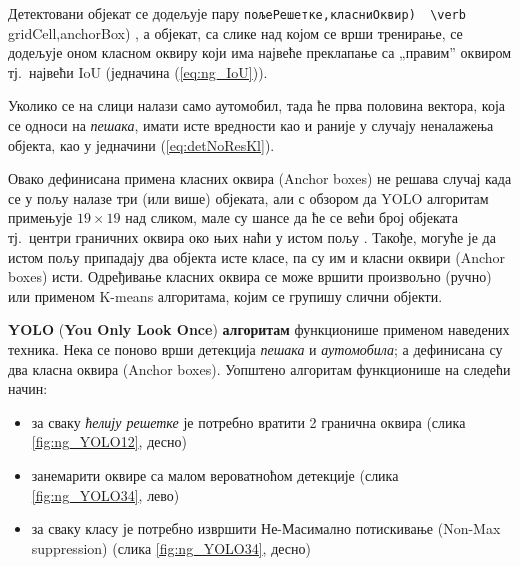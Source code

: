 \documentclass[12pt, а4paper]{article}
\begin{document}
Детектовани објекат се додељује пару
\verb (пољеРешетке,класниОквир)  \verb (gridCell,anchorBox) , а
објекат, са слике над којом се врши тренирање, се додељује оном
класном оквиру који има највеће преклапање са „правим” оквиром тј.\ највећи
IoU (једначина (\ref{eq:ng_IoU})).

Уколико се на слици налази само аутомобил, тада ће прва половина вектора, која
се односи на \textit{пешака}, имати исте вредности као и раније у
случају неналажења објекта,  као у једначини (\ref{eq:detNoResKl}).

Овако дефинисана примена класних оквира (Anchor boxes) не решава случај
када се у пољу  налазе три (или више) објеката, али с обзором
да YOLO алгоритам примењује \mbox{$19 \times 19$}  над сликом,
мале су шансе да ће се већи број објеката тј.\ центри граничних оквира
око њих наћи у истом пољу .
Такође, могуће је да истом пољу припадају два објекта исте класе, па су
им и класни оквири (Anchor boxes) исти. Одређивање класних оквира
се може вршити произвољно (ручно) или применом K-means алгоритама, којим
се групишу слични објекти.

\newpage
\textbf{YOLO} (\textbf{You Only Look Once}) \textbf{алгоритам}
функционише применом наведених техника.
Нека се поново врши детекција \textit{пешака} и \textit{аутомобила};
а дефинисана су два класна оквира (Anchor boxes).
Уопштено алгоритам функционише на следећи начин:
\begin{itemize}
 \item за сваку \textit{ћелију решетке} је потребно вратити 2 гранична
 оквира (слика \ref{fig:ng_YOLO12}, десно)
 \item занемарити оквире са малом вероватноћом детекције
 (слика \ref{fig:ng_YOLO34}, лево)
 \item за сваку класу је потребно извршити Не-Масимално
 потискивање (Non-Max suppression) (слика \ref{fig:ng_YOLO34}, десно)
\end{itemize}
\end{document}
